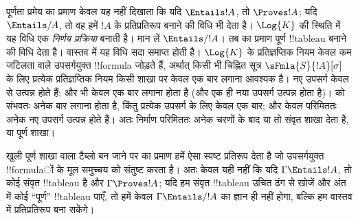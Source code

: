 \documentclass[../../../include/open-logic-section]{subfiles}
\begin{document}
      

\begin{explain}
  पूर्णता प्रमेय का प्रमाण केवल यह नहीं दिखाता कि यदि $\Entails !A$, तो
  $\Proves !A$; यदि $\Entails/ A$, तो वह हमें $!A$ के प्रतिप्रतिरूप बनाने
  की विधि भी देता है। $\Log{K}$ की स्थिति में यह विधि एक \emph{निर्णय
    प्रक्रिया} बनाती है। मान लें $\Entails/ !A$। तब
   का प्रमाण पूर्ण !!{tableau} बनाने की
  विधि देता है। वास्तव में यह विधि सदा समाप्त होती है। $\Log{K}$ के
  प्रतिज्ञप्तिक नियम केवल कम जटिलता वाले उपसर्गयुक्त !!{formula} जोड़ते हैं,
  अर्थात् किसी भी चिह्नित सूत्र $\sFmla{S}{!A}[\sigma]$ के लिए प्रत्येक
  प्रतिज्ञप्तिक नियम किसी शाखा पर केवल एक बार लगाना आवश्यक है। नए उपसर्ग
  केवल
   से उत्पन्न होते हैं; और
   भी केवल एक बार लगाना होता
  है (और एक ही नया उपसर्ग उत्पन्न होता है)।
   को संभवतः अनेक
  बार लगाना होता है, किंतु प्रत्येक उपसर्ग के लिए केवल एक बार; और केवल
  परिमिततः अनेक नए उपसर्ग उत्पन्न होते हैं। अतः निर्माण परिमिततः अनेक
  चरणों के बाद या तो संवृत शाखा देता है, या पूर्ण शाखा।

  खुली पूर्ण शाखा वाला टैब्लो बन जाने पर
   का प्रमाण हमें ऐसा स्पष्ट प्रतिरूप
  देता है जो उपसर्गयुक्त !!{formula}ों के मूल समुच्चय को संतुष्ट करता है।
  अतः केवल यही नहीं कि यदि $\Gamma \Entails !A$, तो कोई संवृत !!{tableau}
  है और $\Gamma \Proves !A$; यदि हम संवृत !!{tableau} उचित ढंग से खोजें और
  अंत में कोई ``पूर्ण'' !!{tableau} पाएँ, तो हमें केवल $\Gamma \Entails/
  !A$ का ज्ञान ही नहीं होगा, बल्कि हम वास्तव में प्रतिप्रतिरूप बना सकेंगे।
\end{explain}
\end{document}
